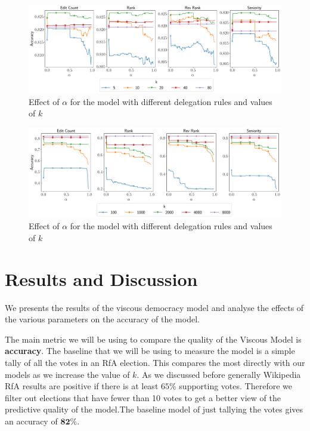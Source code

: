 \begin{figure}[t]
    \centering
    \includegraphics[width=\linewidth]{images/alpha_local.pdf}
    \caption{Effect of $\alpha$ for the \localv model with different delegation rules and values of $k$}
    \label{fig:local-alpha}
\end{figure}
\begin{figure}[t]
    \centering
    \includegraphics[width=\linewidth]{images/alpha_global.pdf}
    \caption{Effect of $\alpha$ for the \globalv model with different delegation rules and values of $k$}
    \label{fig:global-alpha}
\end{figure}

\section{Results and Discussion}

\label{sec:results}
We presents the results of the viscous democracy model and analyse the effects of the various parameters on the accuracy of the model.

The main metric we will be using to compare the quality of the Viscous Model is \textbf{accuracy}. The baseline that we will be using to measure the model is a simple tally of all the votes in an RfA election. This compares the most directly with our models as we increase the value of $k$. As we discussed before generally Wikipedia RfA results are positive if there is at least $65\%$ supporting votes. Therefore we filter out elections that have fewer than 10 votes to get a better view of the predictive quality of the model.The baseline model of just tallying the votes gives an accuracy of $\mathbf{82\%}$. 

